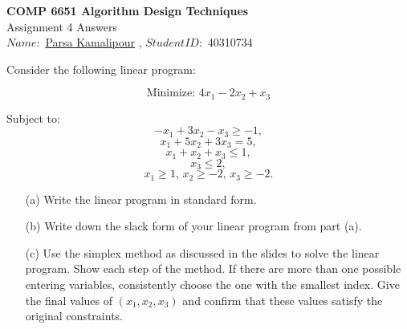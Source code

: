 \documentclass[10pt,letter,notitlepage]{article}
\newcounter{exercise}
\begin{document}
\begin{center}
  \large{\textbf{COMP 6651 Algorithm Design Techniques} \\ Assignment 4 Answers} \\


$Name:$ \href{https://benymaxparsa.github.io}{Parsa Kamalipour} \; , \; $Student ID:$ 40310734

\end{center}



\begin{exercise}[(25 marks)]


Consider the following linear program:

\[
\text{Minimize: } 4x_1 - 2x_2 + x_3
\]

Subject to:
\[
-x_1 + 3x_2 - x_3 \geq -1,
\]
\[
x_1 + 5x_2 + 3x_3 = 5,
\]
\[
x_1 + x_2 + x_3 \leq 1,
\]
\[
x_3 \leq 2,
\]
\[
x_1 \geq 1, \, x_2 \geq -2, \, x_3 \geq -2.
\]

\begin{enumerate}
    \item[(a)] Write the linear program in standard form.
    \item[(b)] Write down the slack form of your linear program from part (a).
    \item[(c)] Use the simplex method as discussed in the slides to solve the linear program.
    Show each step of the method. If there are more than one possible entering variables, 
    consistently choose the one with the smallest index. Give the final values of 
    \((x_1, x_2, x_3)\) and confirm that these values satisfy the original constraints.
\end{enumerate}

\end{exercise}
\end{document}
